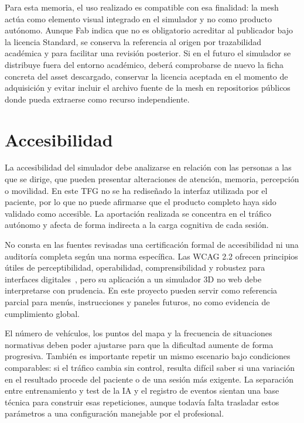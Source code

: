 Para esta memoria, el uso realizado es compatible con esa finalidad: la mesh actúa como elemento visual integrado en el simulador y no como producto autónomo. Aunque Fab indica que no es obligatorio acreditar al publicador bajo la licencia Standard, se conserva la referencia al origen por trazabilidad académica y para facilitar una revisión posterior. Si en el futuro el simulador se distribuye fuera del entorno académico, deberá comprobarse de nuevo la ficha concreta del asset descargado, conservar la licencia aceptada en el momento de adquisición y evitar incluir el archivo fuente de la mesh en repositorios públicos donde pueda extraerse como recurso independiente.

\clearpage
\section{Accesibilidad}

La accesibilidad del simulador debe analizarse en relación con las personas a las que se dirige, que pueden presentar alteraciones de atención, memoria, percepción o movilidad. En este TFG no se ha rediseñado la interfaz utilizada por el paciente, por lo que no puede afirmarse que el producto completo haya sido validado como accesible. La aportación realizada se concentra en el tráfico autónomo y afecta de forma indirecta a la carga cognitiva de cada sesión.

No consta en las fuentes revisadas una certificación formal de accesibilidad ni una auditoría completa según una norma específica. Las WCAG 2.2 ofrecen principios útiles de perceptibilidad, operabilidad, comprensibilidad y robustez para interfaces digitales~\cite{wcag22}, pero su aplicación a un simulador 3D no web debe interpretarse con prudencia. En este proyecto pueden servir como referencia parcial para menús, instrucciones y paneles futuros, no como evidencia de cumplimiento global.

El número de vehículos, los puntos del mapa y la frecuencia de situaciones normativas deben poder ajustarse para que la dificultad aumente de forma progresiva. También es importante repetir un mismo escenario bajo condiciones comparables: si el tráfico cambia sin control, resulta difícil saber si una variación en el resultado procede del paciente o de una sesión más exigente. La separación entre entrenamiento y test de la IA y el registro de eventos sientan una base técnica para construir esas repeticiones, aunque todavía falta trasladar estos parámetros a una configuración manejable por el profesional.


